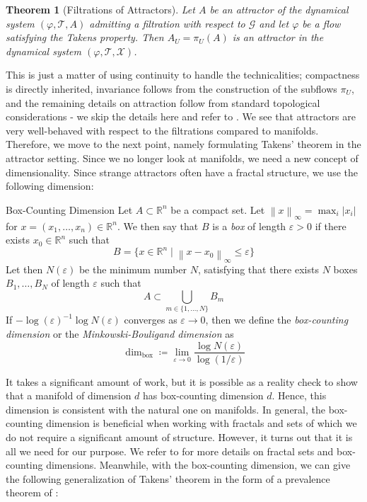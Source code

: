 \documentclass[11pt, a4paper]{memoir}
\theoremstyle{break}
\newtheorem{thm}{Theorem}
\theoremstyle{break}
\theoremstyle{nonumberplain}
\newcommand{\mR}{\mathbb{R}}
\newcommand{\norm}[1]{\left\lVert#1\right\rVert}
\begin{document}
\begin{thm}[Filtrations of Attractors]
Let $A$ be an attractor of the dynamical system $(\varphi, \mathcal{T}, A)$ admitting a filtration with respect to $\mathcal{G}$ and let $\varphi$ be a flow satisfying the Takens property. Then $A_U=\pi_U(A)$ is an attractor in the dynamical system $(\varphi, \mathcal{T},\mathcal{X})$.
\end{thm}
This is just a matter of using continuity to handle the technicalities; compactness is directly inherited, invariance follows from the construction of the subflows $\pi_U$, and the remaining details on attraction follow from standard topological considerations - we skip the details here and refer to \cite{mathFound}. We see that attractors are very well-behaved with respect to the filtrations compared to manifolds. Therefore, we move to the next point, namely formulating Takens' theorem in the attractor setting. Since we no longer look at manifolds, we need a new concept of dimensionality. Since strange attractors often have a fractal structure, we use the following dimension:
\begin{mydefinition}{Box-Counting Dimension}
Let $A\subset \mR^n$ be a compact set. Let $\norm{x}_{\infty}=\max_ i |x_i|$ for $x=(x_1,\ldots,x_n)\in \mR^n$. We then say that $B$ is a \emph{box} of length $\varepsilon>0$ if there exists $x_0\in \mR^n$ such that $$B=\{x\in \mR^n\mid \norm{x-x_0}_{\infty}\leqslant \varepsilon \}$$
Let then $N(\varepsilon)$ be the minimum number $N$, satisfying that there exists $N$ boxes $B_1,\ldots,B_N$ of length $\varepsilon$ such that
$$A\subset \bigcup_{m\in\{1,\ldots,N\}} B_m$$
If $-\log(\varepsilon)^{-1}\log N(\varepsilon)$
converges as $\varepsilon \to 0$, then we define the \emph{box-counting dimension} or the \emph{Minkowski-Bouligand dimension} as
$$\dim_{\text{box}}\coloneqq \lim_{\varepsilon\to 0}\frac{\log N(\varepsilon)}{\log(1/\varepsilon)}$$
\end{mydefinition}
It takes a significant amount of work, but it is possible as a reality check to show that a manifold of dimension $d$ has box-counting dimension $d$. Hence, this dimension is consistent with the natural one on manifolds. In general, the box-counting dimension is beneficial when working with fractals and sets of which we do not require a significant amount of structure. However, it turns out that it is all we need for our purpose. We refer to \cite{Fractals} for more details on fractal sets and box-counting dimensions. Meanwhile, with the box-counting dimension, we can give the following generalization of Takens' theorem in the form of a prevalence theorem of \cite{Sauer1991}:
\end{document}

